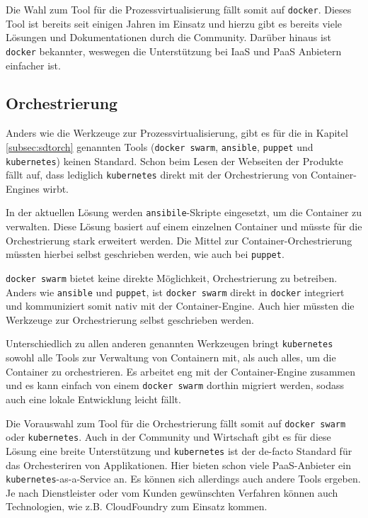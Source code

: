 \documentclass[11pt,a4paper]{article}
\begin{document}
Die Wahl zum Tool für die Prozessvirtualisierung fällt somit auf 
\texttt{docker}. Dieses Tool ist bereits seit einigen Jahren im Einsatz und 
hierzu gibt es bereits viele Lösungen und Dokumentationen durch die Community. 
Darüber hinaus ist \texttt{docker} bekannter, weswegen die Unterstützung 
bei \acf{IaaS} und \acf{PaaS} Anbietern einfacher ist.
\subsection{Orchestrierung} \label{subsec:tunorch}
Anders wie die Werkzeuge zur Prozessvirtualisierung, gibt es für die in Kapitel 
\ref{subsec:sdtorch} genannten Tools (\texttt{docker swarm}, \texttt{ansible}, 
\texttt{puppet} und \texttt{kubernetes}) keinen Standard. Schon beim 
Lesen der Webseiten der Produkte fällt auf, dass lediglich \texttt{kubernetes} 
direkt mit der Orchestrierung von Container-Engines wirbt.

In der aktuellen Lösung \cite{osmib} werden \texttt{ansibile}-Skripte 
eingesetzt, um die Container zu verwalten. Diese Lösung basiert auf 
einem einzelnen Container und müsste für die Orchestrierung stark erweitert 
werden. Die Mittel zur Container-Orchestrierung müssten hierbei selbst 
geschrieben werden, wie auch bei \texttt{puppet}.\cite{ansible}\cite{puppet}

\texttt{docker swarm} bietet keine direkte Möglichkeit, Orchestrierung zu 
betreiben. Anders wie \texttt{ansible} und \texttt{puppet}, ist
\texttt{docker swarm} direkt in \texttt{docker} integriert und 
kommuniziert somit nativ mit der Container-Engine. Auch hier müssten die 
Werkzeuge zur Orchestrierung selbst geschrieben werden.\cite{dockSwarm}

Unterschiedlich zu allen anderen genannten Werkzeugen bringt 
\texttt{kubernetes} sowohl alle Tools zur Verwaltung von Containern mit, als 
auch alles, um die Container zu orchestrieren. Es arbeitet eng mit der 
Container-Engine zusammen und es kann einfach von einem \texttt{docker swarm} 
dorthin migriert werden, sodass auch eine lokale Entwicklung leicht 
fällt.\cite{kubernetes}

Die Vorauswahl zum Tool für die Orchestrierung fällt somit auf
\texttt{docker swarm} oder \texttt{kubernetes}. Auch in der Community und 
Wirtschaft gibt es für diese Lösung eine breite Unterstützung und 
\texttt{kubernetes} ist der de-facto Standard für das Orchesteriren von 
Applikationen. Hier bieten schon viele \ac{PaaS}-Anbieter ein 
\glqq{}\texttt{kubernetes}-as-a-Service\grqq{} an. Es können sich allerdings 
auch andere Tools ergeben. Je nach Dienstleister oder vom Kunden gewünschten 
Verfahren können auch Technologien, wie z.B. CloudFoundry \cite{cloudfoundry} 
zum Einsatz kommen.
\clearpage
\end{document}
